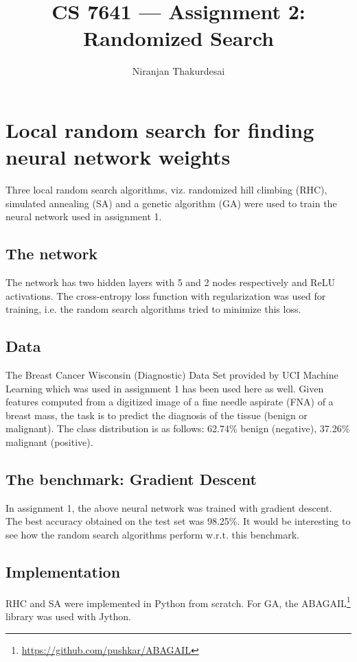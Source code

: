 \documentclass[letterpaper]{article}
\title{CS 7641 --- Assignment 2: Randomized Search}
\author{Niranjan Thakurdesai}
\begin{document}
	\maketitle
	
	\section{Local random search for finding neural network weights}
	Three local random search algorithms, viz. randomized hill climbing (RHC), simulated annealing (SA) and a genetic algorithm (GA) were used to train the neural network used in assignment 1.
	
	\subsection{The network}
	The network has two hidden layers with 5 and 2 nodes respectively and ReLU activations. The cross-entropy loss function with regularization was used for training, i.e. the random search algorithms tried to minimize this loss.
	
	\subsection{Data}
	The Breast Cancer Wisconsin (Diagnostic) Data Set provided by UCI Machine Learning which was used in assignment 1 has been used here as well. Given features computed from a digitized image of a fine needle aspirate (FNA) of a breast mass, the task is to predict the diagnosis of the tissue (benign or malignant). The class distribution is as follows: 62.74\% benign (negative), 37.26\% malignant (positive).
	
	\subsection{The benchmark: Gradient Descent}
	In assignment 1, the above neural network was trained with gradient descent. The best accuracy obtained on the test set was 98.25\%. It would be interesting to see how the random search algorithms perform w.r.t. this benchmark.
	
	\subsection{Implementation}
	RHC and SA were implemented in Python from scratch. For GA, the ABAGAIL\footnote{\url{https://github.com/pushkar/ABAGAIL}} library was used with Jython.
	
\end{document}
